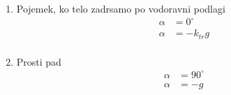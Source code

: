 \begin{enumerate}
	\item Pojemek, ko telo zadrsamo po vodoravni podlagi\\
	\begin{align*}
		\alpha &= 0^{\circ}\\
		\alpha &= -k_{tr}g\\
	\end{align*}
	\item Prosti pad\\
	\begin{align*}
		\alpha &= 90^{\circ}\\
		\alpha &= -g\\
	\end{align*}
\end{enumerate}